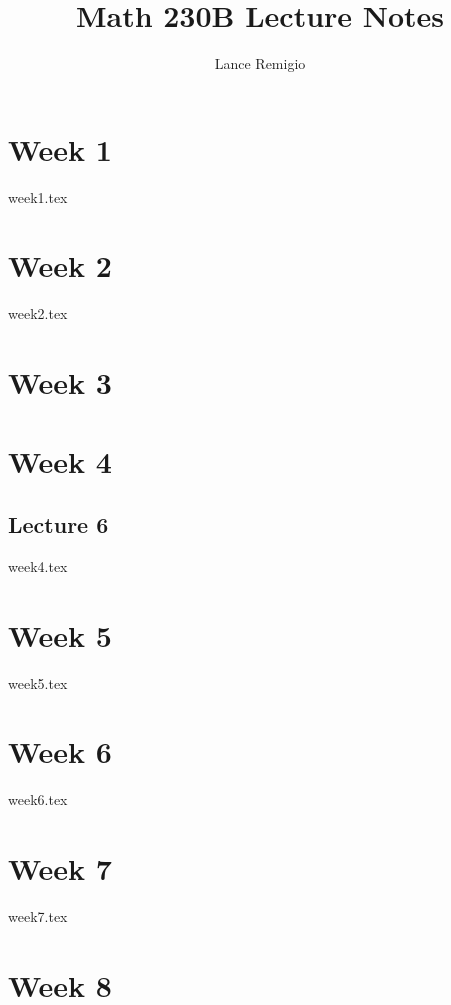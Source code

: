 \documentclass[a4paper]{book}
\title{Math 230B Lecture Notes}
\author{Lance Remigio}
\begin{document}
\maketitle

\chapter{Week 1}

{week1.tex}

\chapter{Week 2}

{week2.tex}

\chapter{Week 3}

\chapter{Week 4}

\section{Lecture 6}

{week4.tex}

\chapter{Week 5}

{week5.tex}

\chapter{Week 6}

{week6.tex}

\chapter{Week 7}

{week7.tex}

\chapter{Week 8}
\end{document}
